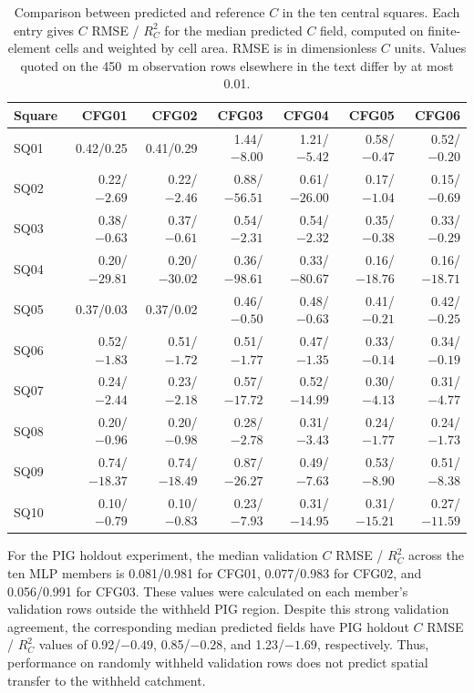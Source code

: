 \documentclass[review,jog]{igs}
\providecommand{\toprule}{\hline}
\providecommand{\midrule}{\hline}
\providecommand{\bottomrule}{\hline}
\begin{document}
\begin{table}
\caption{Comparison between predicted and reference $C$ in the ten central
squares. Each entry gives $C$ RMSE / $R_C^2$ for the median predicted $C$
field, computed on finite-element cells and weighted by cell area. RMSE is in
dimensionless $C$ units. Values quoted on the 450~m observation rows elsewhere
in the text differ by at most 0.01.}
\label{tab:c_diagnostics}
\centering\scriptsize
\setlength{\tabcolsep}{4pt}
\begin{tabular}{lrrrrrr}
\toprule
Square & CFG01 & CFG02 & CFG03 & CFG04 & CFG05 & CFG06\\
\midrule
SQ01 & 0.42/0.25 & 0.41/0.29 & 1.44/$-8.00$ & 1.21/$-5.42$ & 0.58/$-0.47$ & 0.52/$-0.20$ \\
SQ02 & 0.22/$-2.69$ & 0.22/$-2.46$ & 0.88/$-56.51$ & 0.61/$-26.00$ & 0.17/$-1.04$ & 0.15/$-0.69$ \\
SQ03 & 0.38/$-0.63$ & 0.37/$-0.61$ & 0.54/$-2.31$ & 0.54/$-2.32$ & 0.35/$-0.38$ & 0.33/$-0.29$ \\
SQ04 & 0.20/$-29.81$ & 0.20/$-30.02$ & 0.36/$-98.61$ & 0.33/$-80.67$ & 0.16/$-18.76$ & 0.16/$-18.71$ \\
SQ05 & 0.37/0.03 & 0.37/0.02 & 0.46/$-0.50$ & 0.48/$-0.63$ & 0.41/$-0.21$ & 0.42/$-0.25$ \\
SQ06 & 0.52/$-1.83$ & 0.51/$-1.72$ & 0.51/$-1.77$ & 0.47/$-1.35$ & 0.33/$-0.14$ & 0.34/$-0.19$ \\
SQ07 & 0.24/$-2.44$ & 0.23/$-2.18$ & 0.57/$-17.72$ & 0.52/$-14.99$ & 0.30/$-4.13$ & 0.31/$-4.77$ \\
SQ08 & 0.20/$-0.96$ & 0.20/$-0.98$ & 0.28/$-2.78$ & 0.31/$-3.43$ & 0.24/$-1.77$ & 0.24/$-1.73$ \\
SQ09 & 0.74/$-18.37$ & 0.74/$-18.49$ & 0.87/$-26.27$ & 0.49/$-7.63$ & 0.53/$-8.90$ & 0.51/$-8.38$ \\
SQ10 & 0.10/$-0.79$ & 0.10/$-0.83$ & 0.23/$-7.93$ & 0.31/$-14.95$ & 0.31/$-15.21$ & 0.27/$-11.59$ \\
\bottomrule
\end{tabular}
\end{table}


For the PIG holdout experiment, the median validation $C$ RMSE /
$R_C^2$ across the ten MLP members is 0.081/0.981 for CFG01,
0.077/0.983 for CFG02, and 0.056/0.991 for CFG03. These values
were calculated on each member's validation rows outside the
withheld PIG region. Despite this strong validation agreement, the
corresponding median predicted fields have PIG holdout $C$ RMSE /
$R_C^2$ values of 0.92/$-0.49$, 0.85/$-0.28$, and
1.23/$-1.69$, respectively. Thus, performance on randomly withheld
validation rows does not predict spatial transfer to the withheld
catchment. 
\end{document}
